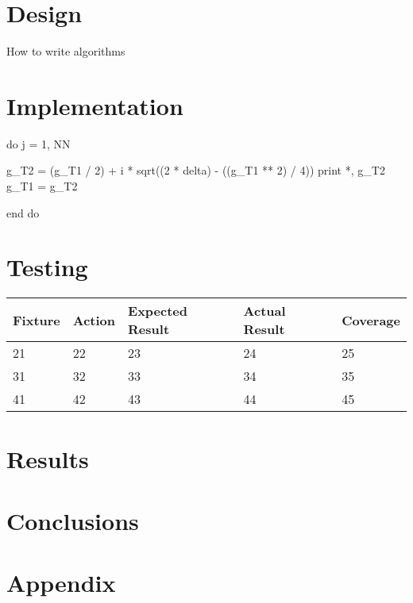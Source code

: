 \documentclass[a4paper,12pt]{article}
\begin{document}
\section{Design}

\begin{algorithm}[H]
\caption{How to write algorithms}
\label{alg:algorithm1}
\end{algorithm}

\section{Implementation}

\begin{fortrancode*}{}
do j = 1, NN
    
    g_T2 = (g_T1 / 2) + i * sqrt((2 * delta) - ((g_T1 ** 2) / 4))
    print *, g_T2
    g_T1 = g_T2
        
end do
\end{fortrancode*}

\section{Testing}

\begin{tabular}{|l|l|l|l|l|}
\hline
	Fixture & Action & Expected Result & Actual Result & Coverage\\
\hline \hline
	21 & 22 & 23 & 24 & 25\\
\hline
	31 & 32 & 33 & 34 & 35\\
\hline
	41 & 42 & 43 & 44 & 45\\
\hline
\end{tabular}


\section{Results}

\section{Conclusions}

\pagebreak
{}
\nocite{*}


\pagebreak
{}
\section*{Appendix}
\end{document}
